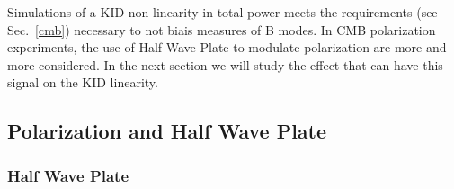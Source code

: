 Simulations of a KID non-linearity in total power meets the requirements (see Sec.~\ref{cmb}) necessary to not biais measures of B modes. In CMB polarization experiments, the use of Half Wave Plate to modulate polarization are more and more considered. In the next section we will study the effect that can have this signal on the KID linearity.

\subsection{Polarization and Half Wave Plate}
\subsubsection{Half Wave Plate}



